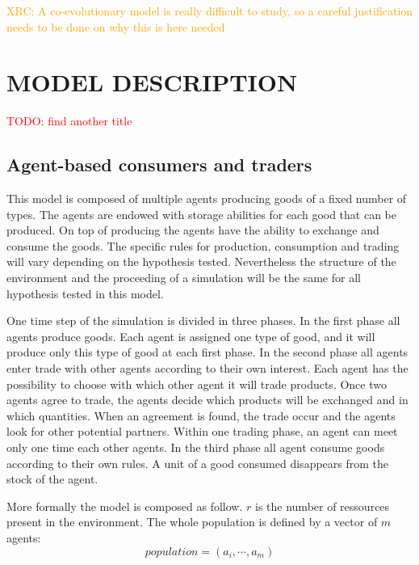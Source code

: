 \documentclass{wscpaperproc}
\newcommand{\memo}[2]{\textcolor{#1}{#2}}
\newcommand{\todo}[1]{\memo{red}{TODO: #1\\}}
\newcommand{\xrc}[1]{\memo{orange}{XRC: #1\\}}
\begin{document}
\xrc{A co-evolutionary model is really difficult to study, so a careful justification needs to be done on why this is here needed}

\section{MODEL DESCRIPTION}

\todo{find another title}
\subsection{Agent-based consumers and traders}

This model is composed of multiple agents producing goods of a fixed number of types. The agents are endowed with storage abilities for each good that can be produced. On top of	producing the agents have the ability to exchange and consume the goods. The specific rules for production, consumption and trading will vary depending on the hypothesis tested. Nevertheless the structure of the environment and the proceeding of a simulation will be the same for all hypothesis tested in this model.

One time step of the simulation is divided in three phases. In the first phase all agents produce goods. Each agent is assigned one type of good, and it will produce only this type of good at each first phase. In the second phase all agents enter trade with other agents according to their own interest. Each agent has the possibility to choose with which other agent it will trade products. Once two agents agree to trade, the agents decide which products will be exchanged and in which quantities. When an agreement is found, the trade occur and the agents look for other potential partners. Within one trading phase, an agent can meet only one time each other agents. In the third phase all agent consume goods according to their own rules. A unit of a good consumed disappears from the stock of the agent.


More formally the model is composed as follow. $r$ is the number of ressources present in the environment. The whole population is defined by a vector of $m$ agents: 
		$$ population = (a_i, \cdots ,a_m) $$
		
\end{document}
